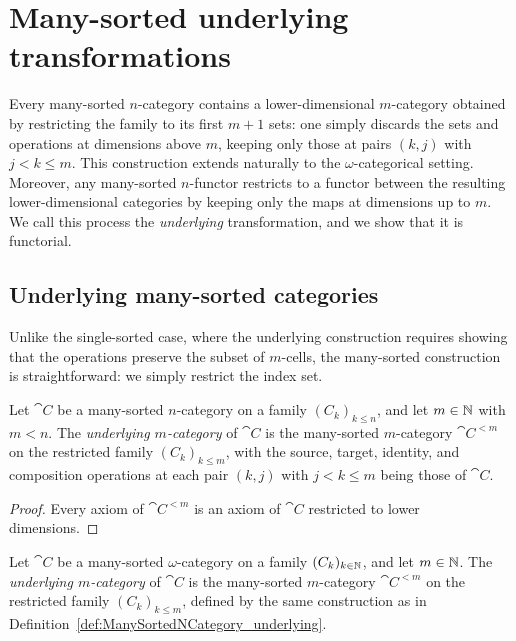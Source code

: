 \chapter{Many-sorted underlying transformations}
\label{ch:ms_underlying}

Every many-sorted $n$-category contains a lower-dimensional $m$-category obtained by restricting the
family to its first $m + 1$ sets: one simply discards the sets and operations at dimensions above
$m$, keeping only those at pairs $(k, j)$ with $j < k \leq m$. This construction extends naturally
to the $\omega$-categorical setting. Moreover, any many-sorted $n$-functor restricts to a functor
between the resulting lower-dimensional categories by keeping only the maps at dimensions up to $m$.
We call this process the \emph{underlying} transformation, and we show that it is functorial.

\section{Underlying many-sorted categories}

Unlike the single-sorted case, where the underlying construction requires showing that the
operations preserve the subset of $m$-cells, the many-sorted construction is straightforward: we
simply restrict the index set.

\begin{construction}
  \label{def:ManySortedNCategory_underlying}
  \leanok
  Let $\cat{C}$ be a many-sorted $n$-category on a family $(C_k)_{k \leq n}$, and let $m \in \mathbb{N}$
  with $m < n$. The \emph{underlying $m$-category} of $\cat{C}$ is the many-sorted $m$-category
  $\cat{C}^{<m}$ on the restricted family $(C_k)_{k \leq m}$, with the source, target, identity, and
  composition operations at each pair $(k, j)$ with $j < k \leq m$ being those of $\cat{C}$.
\end{construction}

\begin{proof}
  \leanok
  Every axiom of $\cat{C}^{<m}$ is an axiom of $\cat{C}$ restricted to lower dimensions.
\end{proof}

\begin{construction}
  \label{def:ManySortedOmegaCategory_underlying}
  \leanok
  Let $\cat{C}$ be a many-sorted $\omega$-category on a family $(C_k)_{k \in \mathbb{N}}$, and let $m \in
  \mathbb{N}$. The \emph{underlying $m$-category} of $\cat{C}$ is the many-sorted $m$-category
  $\cat{C}^{<m}$ on the restricted family $(C_k)_{k \leq m}$, defined by the same construction as in
  Definition~\ref{def:ManySortedNCategory_underlying}.
\end{construction}

